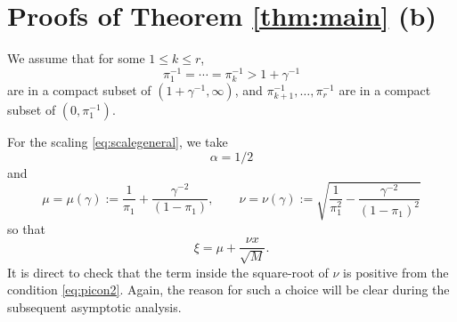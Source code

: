 \documentclass[11pt]{article}
\begin{document}
\section{Proofs of Theorem \ref{thm:main} (b)}
\label{sec:Gausslimit}

We assume that for some $1\le k\le r$,
\begin{equation}\label{eq:picon2}
  \pi^{-1}_1=\cdots = \pi^{-1}_k > 1+\gamma^{-1}
\end{equation}
are in a compact subset of $(1+\gamma^{-1}, \infty)$, and
$\pi^{-1}_{k+1}, \dots, \pi^{-1}_r$ are in a compact subset of
$(0, \pi_1^{-1})$.

For the scaling \eqref{eq:scalegeneral}, we take
\begin{equation}
  \alpha=1/2
\end{equation}
and
\begin{equation}\label{eq:mu2}
  \mu=\mu(\gamma) := \frac1{\pi_1}+\frac{\gamma^{-2}}{(1-\pi_1)}, \qquad
  \nu=\nu(\gamma) := \sqrt{ \frac1{\pi_1^2} - \frac{\gamma^{-2}}{(1-\pi_1)^2} }
\end{equation}
so that
\begin{equation}
  \xi= \mu+\frac{\nu x}{\sqrt{M}}.
\end{equation}
It is direct to check that the term inside the square-root of
$\nu$ is positive from the condition \eqref{eq:picon2}. Again, the
reason for such a choice will be clear during the subsequent
asymptotic analysis.
\end{document}
